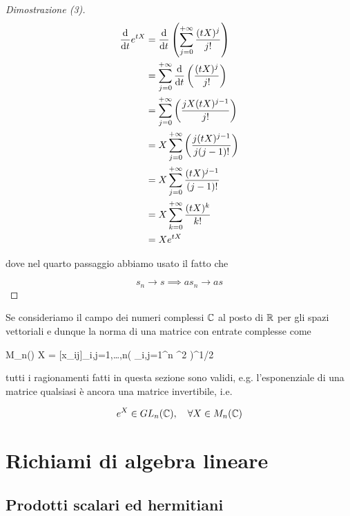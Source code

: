 \begin{proof}[Dimostrazione (3)]
	\begin{align}
		\begin{split}
			\dv{t} e^{t X} &= \dv{t} \left( \sum_{j=0}^{+\infty} \dfrac{(t X)^{j}}{j!} \right) \\
			&= \sum_{j=0}^{+\infty} \dv{t} \left( \dfrac{(t X)^{j}}{j!} \right) \\
			&= \sum_{j=0}^{+\infty} \left( \dfrac{j X (t X)^{j-1}}{j!} \right) \\
			&= X \sum_{j=0}^{+\infty} \left( \dfrac{j (t X)^{j-1}}{j (j-1)!} \right) \\
			&= X \sum_{j=0}^{+\infty} \dfrac{(t X)^{j-1}}{(j-1)!} \\
			&= X \sum_{k=0}^{+\infty} \dfrac{(t X)^{k}}{k!} \\
			&= X e^{t X}
		\end{split}
	\end{align}
	
	dove nel quarto passaggio abbiamo usato il fatto che
	
	\begin{equation}
		s_{n} \to s \implies a s_{n} \to a s
	\end{equation}
\end{proof}

\begin{remark}
	Se consideriamo il campo dei numeri complessi $ \mathbb{C} $ al posto di $ \mathbb{R} $ per gli spazi vettoriali e dunque la norma di una matrice con entrate complesse come
	
	\map{\norm{}}
		{M_{n}(\C)}{\R}
		{X = [x_{ij}]_{i,j=1,\dots,n}}{\left( \sum_{i,j=1}^{n} ^{2} \right)^{1/2}}
		
	tutti i ragionamenti fatti in questa sezione sono validi, e.g. l'esponenziale di una matrice qualsiasi è ancora una matrice invertibile, i.e.
	
	\begin{equation}
		e^{X} \in GL_{n}(\C) \qcomma \forall X \in M_{n}(\C)
	\end{equation}
\end{remark}

\section{Richiami di algebra lineare}

\subsection{Prodotti scalari ed hermitiani}

